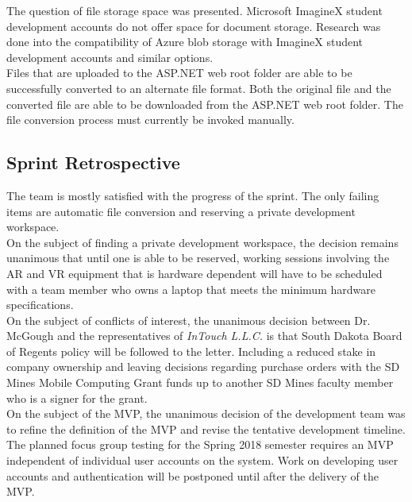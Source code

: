         The question of file storage space was presented.  Microsoft ImagineX student development accounts do not
        offer space for document storage.  Research was done into the compatibility of Azure blob storage with 
        ImagineX student development accounts and similar options.\\
        
        Files that are uploaded to the ASP.NET web root folder are able to be successfully converted to an alternate
        file format.  Both the original file and the converted file are able to be downloaded from the ASP.NET web root
        folder.  The file conversion process must currently be invoked manually.\\

    \subsection{Sprint Retrospective}
    \label{sec:Sprint3_retrospective}
        \hspace{7mm}
        The team is mostly satisfied with the progress of the sprint.  The only failing items are automatic file
        conversion and reserving a private development workspace.\\

        On the subject of finding a private development workspace, the decision remains unanimous that until one 
        is able to be reserved, working sessions involving the AR and VR equipment that is hardware dependent 
        will have to be scheduled with a team member who owns a laptop that meets the minimum hardware
        specifications.\\

        On the subject of conflicts of interest, the unanimous decision between Dr. McGough and the representatives
        of \textit{InTouch L.L.C.} is that South Dakota Board of Regents policy will be followed to the letter.
        Including a reduced stake in company ownership and leaving decisions regarding purchase orders with the SD 
        Mines Mobile Computing Grant funds up to another SD Mines faculty member who is a signer for the grant.\\
        
        On the subject of the MVP, the unanimous decision of the development team was to refine the definition of
        the MVP and revise the tentative development timeline.  The planned focus group testing for the Spring 2018
        semester requires an MVP independent of individual user accounts on the system.  Work on developing user
        accounts and authentication will be postponed until after the delivery of the MVP.

